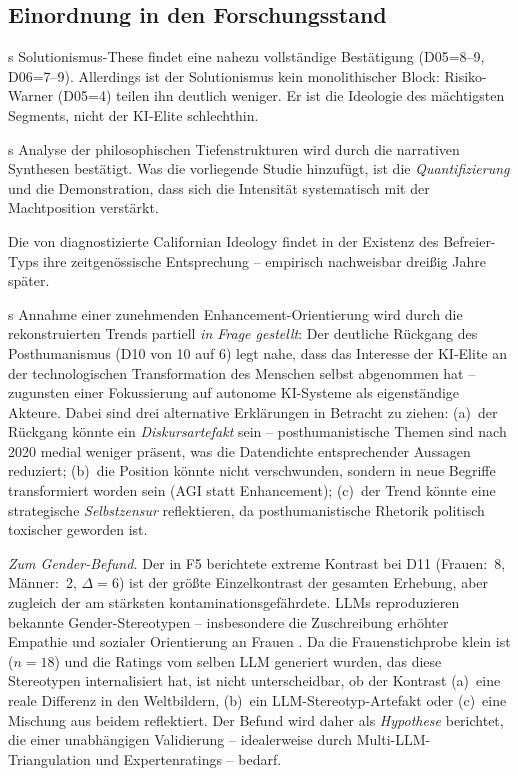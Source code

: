 \documentclass[12pt,a4paper]{article}
\begin{document}
\subsection{Einordnung in den Forschungsstand}
\label{sec:diskussion:einordnung}

\citeauthor{Morozov2013}s Solutionismus-These findet eine nahezu vollst\"andige Best\"atigung (D05=8--9, D06=7--9). Allerdings ist der Solutionismus kein monolithischer Block: Risiko-Warner (D05=4) teilen ihn deutlich weniger. Er ist die Ideologie des m\"achtigsten Segments, nicht der KI-Elite schlechthin.

\citeauthor{Daub2020}s Analyse der philosophischen Tiefenstrukturen wird durch die narrativen Synthesen best\"atigt. Was die vorliegende Studie hinzuf\"ugt, ist die \emph{Quantifizierung} und die Demonstration, dass sich die Intensit\"at systematisch mit der Machtposition verst\"arkt.

Die von \citet{BarbCam1996} diagnostizierte Californian Ideology findet in der Existenz des Befreier-Typs ihre zeitgen\"ossische Entsprechung -- empirisch nachweisbar drei\ss{}ig Jahre sp\"ater.

\citeauthor{Coeckelbergh2020}s Annahme einer zunehmenden Enhancement-Orientierung wird durch die rekonstruierten Trends partiell \emph{in Frage gestellt}: Der deutliche R\"uckgang des Posthumanismus (D10 von 10 auf 6) legt nahe, dass das Interesse der KI-Elite an der technologischen Transformation des Menschen selbst abgenommen hat -- zugunsten einer Fokussierung auf autonome KI-Systeme als eigenst\"andige Akteure. Dabei sind drei alternative Erkl\"arungen in Betracht zu ziehen: (a)~der R\"uckgang k\"onnte ein \emph{Diskursartefakt} sein -- posthumanistische Themen sind nach 2020 medial weniger pr\"asent, was die Datendichte entsprechender Aussagen reduziert; (b)~die Position k\"onnte nicht verschwunden, sondern in neue Begriffe transformiert worden sein (\glqq AGI\grqq{} statt \glqq Enhancement\grqq); (c)~der Trend k\"onnte eine strategische \emph{Selbstzensur} reflektieren, da posthumanistische Rhetorik politisch toxischer geworden ist.

\emph{Zum Gender-Befund.} Der in F5 berichtete extreme Kontrast bei D11 (Frauen:~8, M\"anner:~2, $\Delta = 6$) ist der gr\"o\ss{}te Einzelkontrast der gesamten Erhebung, aber zugleich der am st\"arksten kontaminationsgef\"ahrdete. LLMs reproduzieren bekannte Gender-Stereotypen -- insbesondere die Zuschreibung erh\"ohter Empathie und sozialer Orientierung an Frauen \citep{Santurkar2023}. Da die Frauenstichprobe klein ist ($n = 18$) und die Ratings vom selben LLM generiert wurden, das diese Stereotypen internalisiert hat, ist nicht unterscheidbar, ob der Kontrast (a)~eine reale Differenz in den Weltbildern, (b)~ein LLM-Stereotyp-Artefakt oder (c)~eine Mischung aus beidem reflektiert. Der Befund wird daher als \emph{Hypothese} berichtet, die einer unabh\"angigen Validierung -- idealerweise durch Multi-LLM-Triangulation und Expertenratings -- bedarf.
\end{document}
